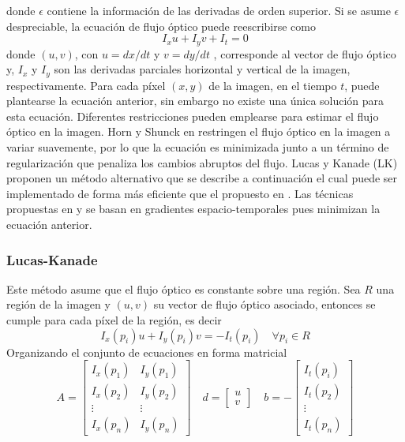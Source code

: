 donde $\epsilon$ contiene la información de las derivadas de orden superior. Si se asume $\epsilon$ despreciable, la ecuación de flujo óptico puede reescribirse como
\begin{equation}
  I_xu +I_yv+I_t = 0
\end{equation}
donde $(u,v)$, con $u = dx/dt$ y $v = dy/dt$ , corresponde al vector de flujo óptico y, $I_x$ y $I_y$ son las derivadas parciales horizontal y vertical de la imagen, respectivamente. Para cada píxel $(x,y)$ de la imagen, en el tiempo $t$, puede plantearse la ecuación anterior, sin embargo no existe una única solución para esta ecuación. Diferentes restricciones pueden emplearse para estimar el flujo óptico en la imagen. Horn y Shunck en \cite{Horn} restringen el flujo óptico en la imagen a variar suavemente, por lo que la ecuación es minimizada junto a un término de regularización que penaliza los cambios abruptos del flujo. Lucas y Kanade (LK) \cite{LKanade} proponen un método alternativo que se describe a continuación el cual puede ser implementado de forma más eficiente que el propuesto en \cite{Horn}. Las técnicas propuestas en \cite{Horn} y \cite{LKanade} se basan en gradientes espacio-temporales pues minimizan la ecuación anterior. 

\subsubsection{Lucas-Kanade}
Este método asume que el flujo óptico es constante sobre una región. Sea $R$ una región de la imagen y $(u,v)$ su vector de flujo óptico asociado, entonces se cumple para cada píxel de la región, es decir
\begin{equation}
  I_x(p_i)u+I_y(p_i)v = -I_t(p_i) \quad  \forall p_i \in R
\end{equation}
Organizando el conjunto de ecuaciones en forma matricial
\begin{equation}
  A=
  \begin{bmatrix}
    I_x(p_1) & I_y(p_1) \\
    I_x(p_2) & I_y(p_2) \\
    \vdots  & \vdots  \\
    I_x(p_n) & I_y(p_n) 
  \end{bmatrix}
  \quad
  d=
  \begin{bmatrix}
    u\\
    v
  \end{bmatrix}
  \quad
  b = -
  \begin{bmatrix}
    I_t(p_i) \\
    I_t(p_2) \\
    \vdots  \\
    I_t(p_n)
  \end{bmatrix} 
\end{equation}

